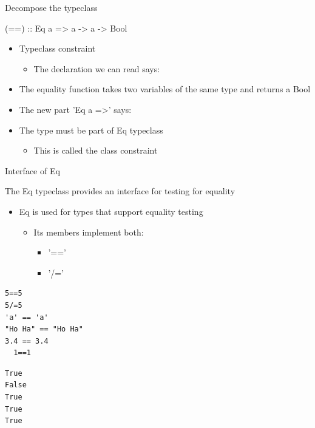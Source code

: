 \documentclass[presetation]{beamer}
\begin{document}
\begin{frame}[label={sec:org1945b97}]{Decompose the typeclass}
\begin{block}{(==) :: Eq a => a -> a -> Bool}
\begin{itemize}
\item Typeclass constraint 
\begin{itemize}
\item The declaration we can read says:
\end{itemize}
\end{itemize}
\pause     
\begin{itemize}
\item The equality function takes two variables of the same type and returns a Bool
\end{itemize}
\pause 
\begin{itemize}
\item The new part 'Eq a =>' says:
\item The type must be part of Eq typeclass
\begin{itemize}
\item This is called the class constraint
\end{itemize}
\end{itemize}
\end{block}
\end{frame}
\begin{frame}[fragile,label={sec:orge5cc17d}]{Interface of Eq}
 \begin{block}{The Eq typeclass provides an interface for testing for equality}
\begin{itemize}
\item Eq is used for types that support equality testing
\begin{itemize}
\item Its members implement both:
\begin{itemize}
\item '=='
\item '/='
\end{itemize}
\end{itemize}
\end{itemize}
\begin{verbatim}
5==5
5/=5
'a' == 'a'
"Ho Ha" == "Ho Ha"
3.4 == 3.4
  1==1
\end{verbatim}

\begin{verbatim}
True
False
True
True
True
\end{verbatim}
\end{block}
\end{frame}
\end{document}
